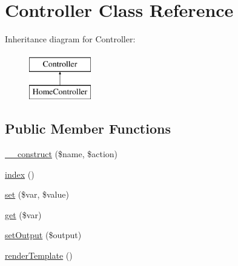 \hypertarget{class_controller}{\section{\-Controller \-Class \-Reference}
\label{class_controller}
}
\-Inheritance diagram for \-Controller\-:\begin{figure}[H]
\begin{center}
\leavevmode
\includegraphics[height=2.000000cm]{class_controller}
\end{center}
\end{figure}
\subsection*{\-Public \-Member \-Functions}
\begin{DoxyCompactItemize}
\item 
\hyperlink{class_controller_a0a34897aaf8c8fc004358f969cb21aa2}{\-\_\-\-\_\-construct} (\$name, \$action)
\item 
\hyperlink{class_controller_a149eb92716c1084a935e04a8d95f7347}{index} ()
\item 
\hyperlink{class_controller_a50fece26b4599caeef500914a96c1679}{set} (\$var, \$value)
\item 
\hyperlink{class_controller_afeac3b78eb982e758740b551ce3617fb}{get} (\$var)
\item 
\hyperlink{class_controller_a66f0ef8e212dc186b2efa1098c2e3eeb}{set\-Output} (\$output)
\item 
\hyperlink{class_controller_a01de01dbee98bec7ed1c12973c02faac}{render\-Template} ()
\end{DoxyCompactItemize}
